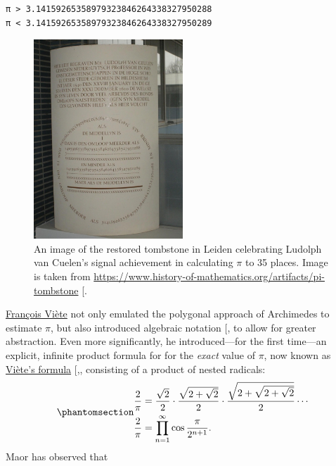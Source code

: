 \documentclass[
  a4paper,
]{article}
\begin{document}
\begin{verbatim}
π > 3.14159265358979323846264338327950288
π < 3.14159265358979323846264338327950289
\end{verbatim}

\begin{figure}
\centering
\includegraphics[width=0.5\textwidth,height=\textheight]{images/van-ceulen-restored-tombstone.jpg}
\caption{An image of the restored tombstone in Leiden celebrating
Ludolph van Cuelen's signal achievement in calculating \(\pi\) to 35
places. Image is taken from
\url{https://www.history-of-mathematics.org/artifacts/pi-tombstone}
{[}\citeproc{ref-tombstone}{12}{]}.}\label{fig:memorial}
\end{figure}

\href{https://en.wikipedia.org/wiki/Fran\%C3\%A7ois_Vi\%C3\%A8te}{François
Viète} not only emulated the polygonal approach of Archimedes to
estimate \(\pi\), but also introduced algebraic notation
{[},\citeproc{ref-maor1998}{14}{]} to allow for
greater abstraction. Even more significantly, he introduced---for the
first time---an explicit, infinite product formula for for the
\emph{exact} value of \(\pi\), now known as
\href{https://en.wikipedia.org/wiki/Vi\%C3\%A8te\%27s_formula}{Viète's
formula}
{[},\citeproc{ref-viete-formula}{15}{]},
consisting of a product of nested radicals:
\begin{equation}\phantomsection\label{eq:viete}{
\begin{aligned}
\frac2\pi &= \frac{\sqrt 2}2 \cdot \frac{\sqrt{2+\sqrt 2}}2 \cdot \frac{\sqrt{2+\sqrt{2+\sqrt 2}}}2 \cdots\\
\frac2\pi &= \prod_{n=1}^{\infty} \cos \frac{\pi}{2^{n+1}}.
\end{aligned}
}\end{equation} Maor has observed that
\end{document}

